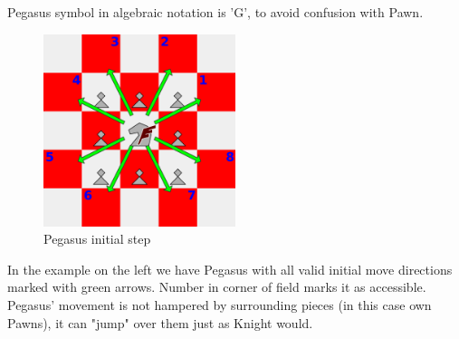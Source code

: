 \documentclass[a5paper,12pt,draft]{book} %
\begin{document}
Pegasus symbol in algebraic notation is 'G', to avoid confusion with Pawn.

\vspace{1\baselineskip}

\noindent
\begin{figure}
\includegraphics[width=0.5\textwidth, keepaspectratio=true]{../gfx/examples/01_move_pegasus_initial.png}
\caption{Pegasus initial step}
\label{fig:pegasus_initial_step}
\end{figure}
\indent
In the example on the left we have Pegasus with all valid initial move directions
marked with green arrows. Number in corner of field marks it as accessible.
Pegasus' movement is not hampered by surrounding pieces (in this case own Pawns),
it can "jump" over them just as Knight would.

\clearpage
\end{document}
